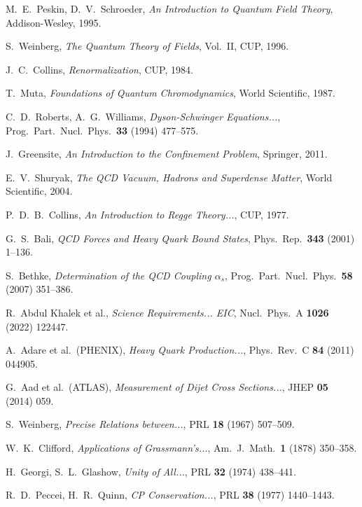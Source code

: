 \documentclass[11pt,a4paper]{article}
\theoremstyle{definition}
\theoremstyle{plain}
\theoremstyle{remark}
\begin{document}
\begin{thebibliography}{99}
M.~E.~Peskin, D.~V.~Schroeder, \emph{An Introduction to Quantum Field Theory}, Addison-Wesley, 1995.

S.~Weinberg, \emph{The Quantum Theory of Fields}, Vol.~II, CUP, 1996.

J.~C.~Collins, \emph{Renormalization}, CUP, 1984.

T.~Muta, \emph{Foundations of Quantum Chromodynamics}, World Scientific, 1987.

C.~D.~Roberts, A.~G.~Williams, \emph{Dyson-Schwinger Equations...}, Prog.\ Part.\ Nucl.\ Phys.\ \textbf{33} (1994) 477--575.

J.~Greensite, \emph{An Introduction to the Confinement Problem}, Springer, 2011.

E.~V.~Shuryak, \emph{The QCD Vacuum, Hadrons and Superdense Matter}, World Scientific, 2004.

P.~D.~B.~Collins, \emph{An Introduction to Regge Theory...}, CUP, 1977.

G.~S.~Bali, \emph{QCD Forces and Heavy Quark Bound States}, Phys.\ Rep.\ \textbf{343} (2001) 1--136.

S.~Bethke, \emph{Determination of the QCD Coupling $\alpha_s$}, Prog.\ Part.\ Nucl.\ Phys.\ \textbf{58} (2007) 351--386.

R.~Abdul Khalek et al., \emph{Science Requirements... EIC}, Nucl.\ Phys.\ A \textbf{1026} (2022) 122447.

A.~Adare et al.\ (PHENIX), \emph{Heavy Quark Production...}, Phys.\ Rev.\ C \textbf{84} (2011) 044905.

G.~Aad et al.\ (ATLAS), \emph{Measurement of Dijet Cross Sections...}, JHEP \textbf{05} (2014) 059.

S.~Weinberg, \emph{Precise Relations between...}, PRL \textbf{18} (1967) 507--509.

W.~K.~Clifford, \emph{Applications of Grassmann's...}, Am.\ J.\ Math.\ \textbf{1} (1878) 350--358.

H.~Georgi, S.~L.~Glashow, \emph{Unity of All...}, PRL \textbf{32} (1974) 438--441.

R.~D.~Peccei, H.~R.~Quinn, \emph{CP Conservation...}, PRL \textbf{38} (1977) 1440--1443.

\end{thebibliography}

\end{document}
